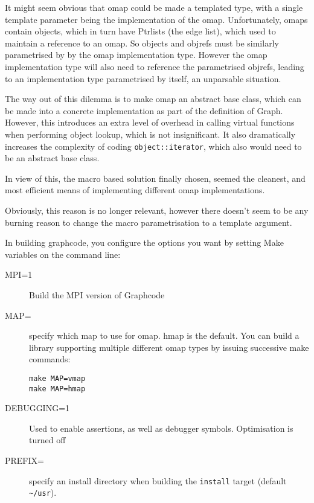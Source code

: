 
It might seem obvious that omap could be made a templated type, with a
single template parameter being the implementation of the
omap. Unfortunately, omaps contain objects, which in turn have
Ptrlists (the edge list), which used to maintain a reference to an
omap. So objects and objrefs must be similarly parametrised by by the
omap implementation type. However the omap implementation type will
also need to reference the parametrised objrefs, leading to an
implementation type parametrised by itself, an unparsable situation.

The way out of this dilemma is to make omap an abstract base class,
which can be made into a concrete implementation as part of the
definition of Graph. However, this introduces an extra level of
overhead in calling virtual functions when performing object
lookup, which is not insignificant. It also dramatically increases the complexity of coding
\verb+object::iterator+, which also would need to be an abstract base
class.

In view of this, the macro based solution finally chosen, seemed the
cleanest, and most efficient means of implementing different omap
implementations.

Obviously, this reason is no longer relevant, however there doesn't seem to
be any burning reason to change the macro parametrisation to a
template argument.


In building graphcode, you configure the options you want by setting
Make variables on the command line:
\begin{description}
\item[MPI=1] Build the MPI version of Graphcode
\item[MAP=] specify which map to use for omap. hmap is the
  default. You can build a library supporting multiple different omap
  types by issuing successive make commands:
\begin{verbatim}
make MAP=vmap
make MAP=hmap
\end{verbatim}
\item[DEBUGGING=1] Used to enable assertions, as well as debugger
  symbols. Optimisation is turned off
\item[PREFIX=] specify an install directory when building the
  \verb+install+ target (default \verb+~/usr+).
\end{description}


